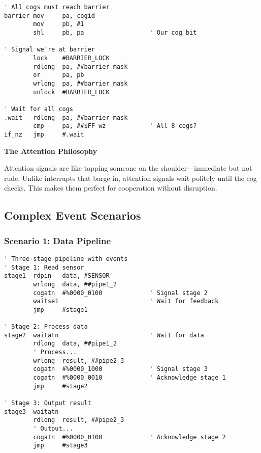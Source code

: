 \documentclass[11pt]{book}
\begin{document}
\begin{lstlisting}
' All cogs must reach barrier
barrier mov     pa, cogid
        mov     pb, #1
        shl     pb, pa                  ' Our cog bit
        
' Signal we're at barrier
        lock    #BARRIER_LOCK
        rdlong  pa, ##barrier_mask
        or      pa, pb
        wrlong  pa, ##barrier_mask
        unlock  #BARRIER_LOCK
        
' Wait for all cogs
.wait   rdlong  pa, ##barrier_mask
        cmp     pa, ##$FF wz            ' All 8 cogs?
if_nz   jmp     #.wait
\end{lstlisting}

\begin{interlude}
\textbf{The Attention Philosophy}

Attention signals are like tapping someone on the shoulder—immediate but not rude. Unlike interrupts that barge in, attention signals wait politely until the cog checks. This makes them perfect for cooperation without disruption.
\end{interlude}

\hypertarget{complex-event-scenarios}{%
\subsection{Complex Event Scenarios}\label{complex-event-scenarios}}

\hypertarget{scenario-1-data-pipeline}{%
\subsubsection{Scenario 1: Data
Pipeline}\label{scenario-1-data-pipeline}}

\begin{lstlisting}
' Three-stage pipeline with events
' Stage 1: Read sensor
stage1  rdpin   data, #SENSOR
        wrlong  data, ##pipe1_2
        cogatn  #%0000_0100             ' Signal stage 2
        waitse1                         ' Wait for feedback
        jmp     #stage1

' Stage 2: Process data  
stage2  waitatn                         ' Wait for data
        rdlong  data, ##pipe1_2
        ' Process...
        wrlong  result, ##pipe2_3
        cogatn  #%0000_1000             ' Signal stage 3
        cogatn  #%0000_0010             ' Acknowledge stage 1
        jmp     #stage2

' Stage 3: Output result
stage3  waitatn
        rdlong  result, ##pipe2_3
        ' Output...
        cogatn  #%0000_0100             ' Acknowledge stage 2
        jmp     #stage3
\end{lstlisting}
\end{document}
